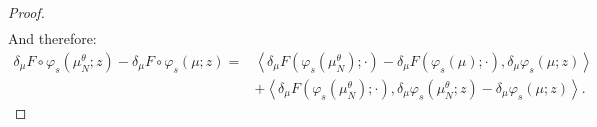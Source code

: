 \documentclass[11pt,a4paper]{article}
\newcommand{\brac}[1]{\left\langle#1\right\rangle}
\begin{document}
\begin{proof}
\begin{align*}
    \end{align*}
    And therefore:
    \begin{subequations}
    \begin{align}
        \delta_\mu F\circ \varphi_s\left(\mu^\theta_N;z\right) - \delta_\mu F\circ \varphi_s(\mu;z) =& \brac{\delta_\mu F\left(\varphi_s\left(\mu^\theta_N\right);\cdot\right) - \delta_\mu F(\varphi_s(\mu);\cdot),\delta_\mu \varphi_s (\mu;z)}\label{proof:eq:samesame-part1} \\
         &+ \brac{\delta_\mu F\left(\varphi_s\left(\mu^\theta_N\right);\cdot\right),\delta_\mu \varphi_s \left(\mu^\theta_N;z\right) - \delta_\mu \varphi_s (\mu;z)}\label{proof:eq:samesame-part2} .
    \end{align}
    \end{subequations}


\end{proof}
\end{document}
